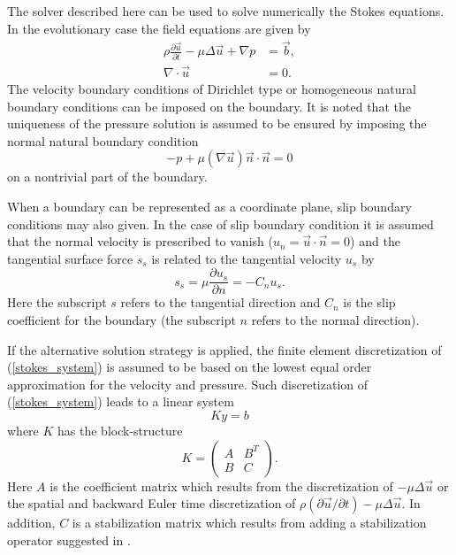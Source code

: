 The solver described here can be used to solve numerically the  
Stokes equations.
In the evolutionary case the field equations are given by
\begin{equation}\label{stokes_system}
\begin{split}
\rho\frac{\partial\vec u}{\partial t} - \mu \Delta\vec u +\nabla p &= \vec b, \\
\nabla \cdot \vec u &= 0.
\end{split}
\end{equation}
The velocity boundary conditions of Dirichlet type or
homogeneous natural boundary conditions can be imposed on the boundary.
It is noted that
the uniqueness of the pressure solution is assumed to be 
ensured by imposing the normal natural boundary condition        
\begin{equation}\label{Neumann-outflow}
-p + \mu (\nabla\vec u)\vec n\cdot\vec n = 0
\end{equation}
on a nontrivial part of the boundary. 

When a boundary can be represented as a coordinate plane,
slip boundary conditions may also given. In the case of slip
boundary condition it is assumed that the normal velocity is prescribed
to vanish ($u_n = \vec u \cdot \vec n = 0$) and the tangential
surface force $s_s$ is related to the tangential velocity $u_s$ by
\begin{equation}\label{slipbc}
s_s = \mu \frac{\partial u_s}{\partial n} = -C_n u_s.
\end{equation}
Here the subscript $s$ refers to the tangential direction and 
$C_n$ is the slip coefficient for the boundary (the subscript $n$ refers to
the normal direction).

If the alternative solution strategy is applied,  
the finite element discretization of (\ref{stokes_system}) is assumed to be 
based on the lowest equal order approximation for the velocity and pressure. 
Such discretization of (\ref{stokes_system}) leads to a linear system 
\begin{equation}\label{discrete-stokes-system}
Ky=b
\end{equation}
where $K$ has the block-structure
\begin{equation}\label{block-structure}
K=\left( \begin{array}{cc} A    & B^T \\
                         B    & C   \end{array}\right). 
\end{equation}
Here $A$ is the coefficient matrix which results from the discretization 
of $-\mu\Delta \vec u$ or the spatial and backward Euler time discretization of
$\rho(\partial\vec u /\partial t) -\mu\Delta \vec u$.
In addition, $C$ is a stabilization matrix
which results from adding a stabilization operator suggested in \cite{Do04}.

